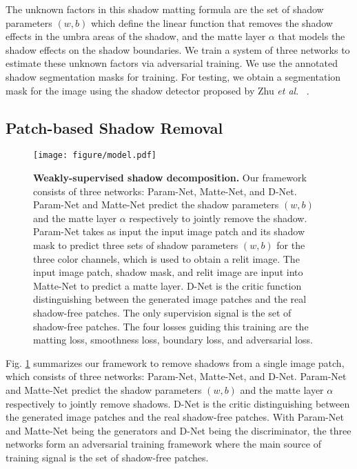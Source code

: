 \documentclass[runningheads]{llncs}
\def\etal{\emph{et al}.}
\begin{document}
The unknown factors in this shadow matting formula are the set of shadow parameters $(w,b)$ which define the linear function that removes the shadow effects in the umbra areas of the shadow, and the matte layer $\alpha$ that models the shadow effects on the shadow boundaries. We train a system of three networks to estimate these unknown factors via adversarial training. We use the annotated shadow segmentation masks for training. For testing, we obtain a segmentation mask for the image using the shadow detector proposed by Zhu \etal~ \cite{zhu18b}.

\subsection{Patch-based Shadow Removal}
\label{sec:method_patch}

\begin{figure}[t!]
	\centering
  \texttt{[image: figure/model.pdf]}

  \caption{\textbf{Weakly-supervised shadow decomposition.} Our framework consists of three networks: Param-Net, Matte-Net, and D-Net. Param-Net and Matte-Net predict the shadow parameters $(w,b)$ and the matte layer $\alpha$ respectively to jointly remove the shadow. Param-Net takes as input the input image patch and its shadow mask to predict three sets of shadow parameters $(w,b)$ for the three color channels, which is used to obtain a relit image. The input image patch, shadow mask, and relit image are input into Matte-Net to predict a matte layer.  D-Net is the critic function distinguishing between the generated image patches and the real shadow-free patches. The only supervision signal is the set of shadow-free patches. The four losses guiding this training are the matting loss, smoothness loss, boundary loss, and adversarial loss.}
  \label{fig:model}
\end{figure}

Fig. \ref{fig:model} summarizes our framework to remove shadows from a single image patch, which consists of three networks: Param-Net, Matte-Net, and D-Net. Param-Net and Matte-Net predict the shadow parameters $(w,b)$ and the matte layer $\alpha$ respectively to jointly remove shadows. D-Net is the critic distinguishing between the generated image patches and the real shadow-free patches. With Param-Net and Matte-Net being the generators and D-Net being the discriminator, the three networks form an adversarial training framework where the main source of training signal is the set of shadow-free patches. 
\end{document}
